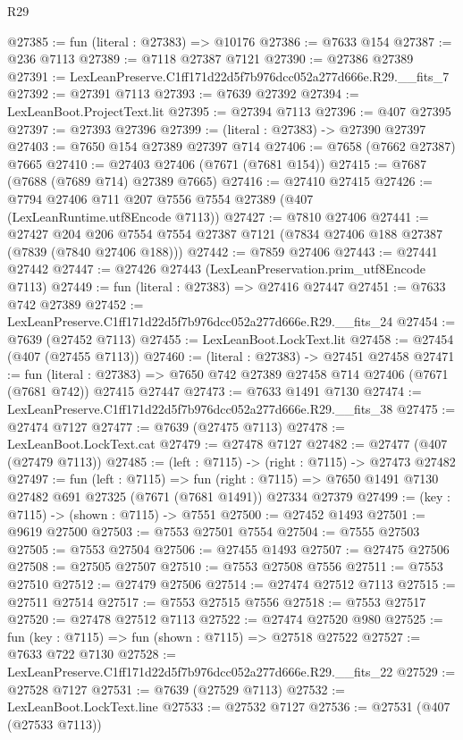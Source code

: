 \begin{lexlean}{R29}
\begin{coremodule}
@27385 := fun (literal : @27383) => @10176
@27386 := @7633 @154
@27387 := @236 @7113
@27389 := @7118 @27387 @7121
@27390 := @27386 @27389
@27391 := LexLeanPreserve.C1ff171d22d5f7b976dcc052a277d666e.R29.__fits_7
@27392 := @27391 @7113
@27393 := @7639 @27392
@27394 := LexLeanBoot.ProjectText.lit
@27395 := @27394 @7113
@27396 := @407 @27395
@27397 := @27393 @27396
@27399 := (literal : @27383) -> @27390 @27397
@27403 := @7650 @154 @27389 @27397 @714
@27406 := @7658 (@7662 @27387) @7665
@27410 := @27403 @27406 (@7671 (@7681 @154))
@27415 := @7687 (@7688 (@7689 @714) @27389 @7665)
@27416 := @27410 @27415
@27426 := @7794 @27406 @711 @207 @7556 @7554 @27389 (@407 (LexLeanRuntime.utf8Encode @7113))
@27427 := @7810 @27406
@27441 := @27427
    @204
    @206
    @7554
    @7554
    @27387
    @7121
    (@7834 @27406 @188 @27387 (@7839 (@7840 @27406 @188)))
@27442 := @7859 @27406
@27443 := @27441 @27442
@27447 := @27426 @27443 (LexLeanPreservation.prim_utf8Encode @7113)
@27449 := fun (literal : @27383) => @27416 @27447
@27451 := @7633 @742 @27389
@27452 := LexLeanPreserve.C1ff171d22d5f7b976dcc052a277d666e.R29.__fits_24
@27454 := @7639 (@27452 @7113)
@27455 := LexLeanBoot.LockText.lit
@27458 := @27454 (@407 (@27455 @7113))
@27460 := (literal : @27383) -> @27451 @27458
@27471 := fun (literal : @27383) =>
  @7650 @742 @27389 @27458 @714 @27406 (@7671 (@7681 @742)) @27415 @27447
@27473 := @7633 @1491 @7130
@27474 := LexLeanPreserve.C1ff171d22d5f7b976dcc052a277d666e.R29.__fits_38
@27475 := @27474 @7127
@27477 := @7639 (@27475 @7113)
@27478 := LexLeanBoot.LockText.cat
@27479 := @27478 @7127
@27482 := @27477 (@407 (@27479 @7113))
@27485 := (left : @7115) -> (right : @7115) -> @27473 @27482
@27497 := fun (left : @7115) =>
  fun (right : @7115) => @7650 @1491 @7130 @27482 @691 @27325 (@7671 (@7681 @1491)) @27334 @27379
@27499 := (key : @7115) -> (shown : @7115) -> @7551
@27500 := @27452 @1493
@27501 := @9619 @27500
@27503 := @7553 @27501 @7554
@27504 := @7555 @27503
@27505 := @7553 @27504
@27506 := @27455 @1493
@27507 := @27475 @27506
@27508 := @27505 @27507
@27510 := @7553 @27508 @7556
@27511 := @7553 @27510
@27512 := @27479 @27506
@27514 := @27474 @27512 @7113
@27515 := @27511 @27514
@27517 := @7553 @27515 @7556
@27518 := @7553 @27517
@27520 := @27478 @27512 @7113
@27522 := @27474 @27520 @980
@27525 := fun (key : @7115) => fun (shown : @7115) => @27518 @27522
@27527 := @7633 @722 @7130
@27528 := LexLeanPreserve.C1ff171d22d5f7b976dcc052a277d666e.R29.__fits_22
@27529 := @27528 @7127
@27531 := @7639 (@27529 @7113)
@27532 := LexLeanBoot.LockText.line
@27533 := @27532 @7127
@27536 := @27531 (@407 (@27533 @7113))

\end{coremodule}
\end{lexlean}
